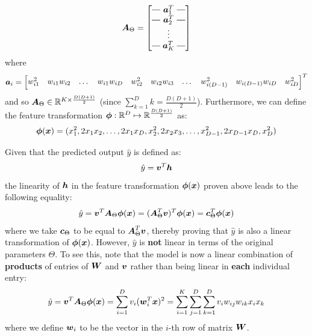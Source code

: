 \begin{questions}
        \begin{equation*}
            \vb*{A}_{\Theta} = 
            \brows{\vb*{a}_1^T \\ \vb*{a}_2^T \\ \rowsvdots \\ \vb*{a}_K^T}
        \end{equation*}
        where
        \begin{equation*}
            \vb*{a}_i = 
            \begin{bmatrix}
            w_{i1}^2 & w_{i1}w_{i2} & \dots & w_{i1}w_{iD} & w_{i2}^2 & w_{i2}w_{i3} & \dots & w_{i(D - 1)}^2  & w_{i(D - 1)} w_{iD} &  w_{iD}^2
            \end{bmatrix}^T
        \end{equation*}
        and so $\vb*{A}_{\Theta} \in \mathbb{R}^{K \times \frac{D(D + 1)}{2}}$ (since $\sum_{k = 1}^{D} k = \frac{D(D + 1)}{2}$). Furthermore, we can define the feature transformation $\vb*{\phi} : \mathbb{R}^D \mapsto  \mathbb{R}^{\frac{D(D + 1)}{2}}$ as:
        \begin{equation*}
            \vb*{\phi}(\vb*{x}) = (x_1^2, 2x_1 x_2, \dots, 2x_1 x_D, x_2^2, 2x_2 x_3, \dots, x_{D - 1}^2, 2x_{D - 1} x_{D}, x_{D}^2)
        \end{equation*}

        \question
        Given that the predicted output $\hat{y}$ is defined as:
        \[
            \hat{y} = \vb*{v}^T \vb*{h}
        \]
        the linearity of $\vb*{h}$ in the feature transformation $\vb*{\phi}(\vb*{x})$ proven above leads to the following equality:
        \[
            \hat{y} = \vb*{v}^T \vb*{A}_{\Theta} \vb*{\phi}(\vb*{x}) 
                    = (\vb*{A}_{\Theta}^T \vb*{v})^T \vb*{\phi}(\vb*{x}) 
                    = \vb*{c}_{\Theta}^T \vb*{\phi}(\vb*{x}) 
        \]
        where we take $\vb*{c}_{\Theta}$ to be equal to $\vb*{A}_{\Theta}^T \vb*{v}$, thereby proving that $\hat{y}$ is also a linear transformation of $\vb*{\phi}(\vb*{x})$. However, $\hat{y}$ is \textbf{not} linear in terms of the original parameters $\Theta$. To see this, note that the model is now a linear combination of \textbf{products} of entries of $\vb*{W}$ and $\vb*{v}$ rather than being linear in \textbf{each} individual entry:
        \[
            \hat{y} = \vb*{v}^T \vb*{A}_{\Theta} \vb*{\phi}(\vb*{x}) = \sum_{i = 1}^{D} v_i (\vb*{w}_i^T \vb*{x})^2 
            = \sum_{i = 1}^{K} \sum_{j = 1}^{D} \sum_{k = 1}^{D} v_i w_{ij} w_{ik} x_i x_k
        \]
        where we define $\vb*{w}_i$ to be the vector in the $i$-th row of matrix $\vb*{W}$.


\end{questions}
